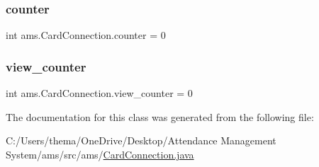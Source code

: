 \subsubsection{\texorpdfstring{counter}{counter}}
{\footnotesize\ttfamily int ams.\+Card\+Connection.\+counter = 0\hspace{0.3cm}{\ttfamily [static]}}

\mbox{\label{classams_1_1_card_connection_a608f1d4516c799989ec105c6b72a83f1}} 
\subsubsection{\texorpdfstring{view\_counter}{view\_counter}}
{\footnotesize\ttfamily int ams.\+Card\+Connection.\+view\+\_\+counter = 0\hspace{0.3cm}{\ttfamily [static]}}



The documentation for this class was generated from the following file\+:\begin{DoxyCompactItemize}
\item 
C\+:/\+Users/thema/\+One\+Drive/\+Desktop/\+Attendance Management System/ams/src/ams/\mbox{\hyperlink{_card_connection_8java}{Card\+Connection.\+java}}\end{DoxyCompactItemize}
